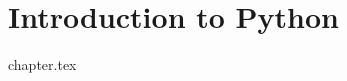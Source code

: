 \documentclass{beamer}
\begin{document}




\section{Introduction to Python}
{chapter.tex}
\end{document}
